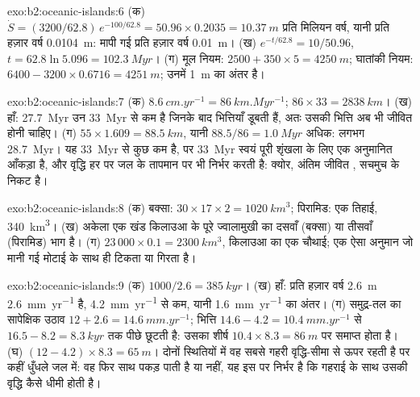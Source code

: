 \begin{solution}{exo:b2:oceanic-islands:6}
(क) $\dot S = (3200/62.8)\,e^{-100/62.8} = 50.96\times0.2035 = \qty{10.37}{m}$ प्रति मिलियन वर्ष,
यानी प्रति हज़ार वर्ष \qty{0.0104}{m}: मापी गई प्रति हज़ार वर्ष \qty{0.01}{m}। (ख) $e^{-t/62.8}
= 10/50.96$, $t = 62.8\ln5.096 = \qty{102.3}{Myr}$। (ग) मूल नियम: $2500 + 350\times5 =
\qty{4250}{m}$; घातांकी नियम: $6400 - 3200\times0.6716 = \qty{4251}{m}$; उनमें
\qty{1}{m} का अंतर है।
\end{solution}

\begin{solution}{exo:b2:oceanic-islands:7}
(क) $\qty{8.6}{cm.yr^{-1}} = \qty{86}{km.Myr^{-1}}$; $86\times33 = \qty{2838}{km}$। (ख) हाँ:
\qty{27.7}{Myr} उन \qty{33}{Myr} से कम है जिनके बाद भित्तियाँ डूबती हैं, अतः उसकी भित्ति अब भी
जीवित होनी चाहिए। (ग) $55\times1.609 = \qty{88.5}{km}$, यानी $88.5/86 = \qty{1.0}{Myr}$ अधिक: लगभग
\qty{28.7}{Myr}। यह \qty{33}{Myr} से कुछ कम है, पर \qty{33}{Myr} स्वयं पूरी शृंखला के लिए एक
अनुमानित आँकड़ा है, और वृद्धि हर  पर जल के तापमान पर भी निर्भर करती है:
क्योर, अंतिम जीवित , सचमुच  के निकट है।
\end{solution}

\begin{solution}{exo:b2:oceanic-islands:8}
(क) बक्सा: $30\times17\times2 = \qty{1020}{km^3}$; पिरामिड: एक तिहाई, \qty{340}{km^3}। (ख) अकेला एक खंड
किलाउआ के पूरे ज्वालामुखी का दसवाँ (बक्सा) या तीसवाँ (पिरामिड) भाग है। (ग) $23\,000\times
0.1 = \qty{2300}{km^3}$, किलाउआ का एक चौथाई; एक ऐसा अनुमान जो मानी गई मोटाई के साथ
ही टिकता या गिरता है।
\end{solution}

\begin{solution}{exo:b2:oceanic-islands:9}
(क) $1000/2.6 = \qty{385}{kyr}$। (ख) हाँ: प्रति हज़ार वर्ष \qty{2.6}{m}
\qty{2.6}{mm.yr^{-1}} है, \qty{4.2}{mm.yr^{-1}} से कम, यानी \qty{1.6}{mm.yr^{-1}} का अंतर।
(ग) समुद्र-तल का सापेक्षिक उठाव $12 + 2.6 = \qty{14.6}{mm.yr^{-1}}$; भित्ति $14.6 - 4.2 =
\qty{10.4}{mm.yr^{-1}}$ से $16.5 - 8.2 = \qty{8.3}{kyr}$ तक पीछे छूटती है: उसका शीर्ष $10.4\times8.3 =
\qty{86}{m}$ पर समाप्त होता है। (घ) $(12 - 4.2)\times8.3 = \qty{65}{m}$। दोनों स्थितियों में वह सबसे गहरी
वृद्धि-सीमा से ऊपर रहती है पर कहीं धुँधले जल में: वह फिर साथ पकड़ पाती है या नहीं, यह इस पर निर्भर है कि गहराई के साथ
उसकी वृद्धि कैसे धीमी होती है।
\end{solution}

